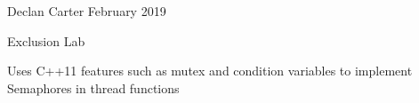 Declan Carter February 2019

Exclusion Lab

Uses C++11 features such as mutex and condition variables to implement Semaphores in thread functions 